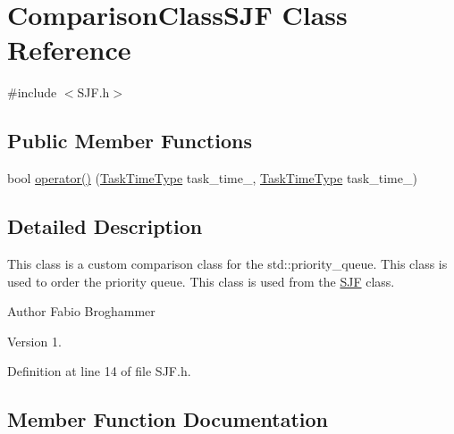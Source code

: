 \hypertarget{class_comparison_class_s_j_f}{}\section{Comparison\+Class\+S\+J\+F Class Reference}
\label{class_comparison_class_s_j_f}


{\ttfamily \#include $<$S\+J\+F.\+h$>$}

\subsection*{Public Member Functions}
\begin{DoxyCompactItemize}
\item 
bool \hyperlink{class_comparison_class_s_j_f_a7cbc92a9f2f87912040ce92e79d0aa2b}{operator()} (\hyperlink{_scheduling_strategy_8h_a3fb457f0594d33676e56256c3403e52b}{Task\+Time\+Type} task\+\_\+time\+\_, \hyperlink{_scheduling_strategy_8h_a3fb457f0594d33676e56256c3403e52b}{Task\+Time\+Type} task\+\_\+time\+\_)
\end{DoxyCompactItemize}


\subsection{Detailed Description}
This class is a custom comparison class for the std\+::priority\+\_\+queue. This class is used to order the priority queue. This class is used from the \hyperlink{class_s_j_f}{S\+J\+F} class.

\begin{DoxyAuthor}{Author}
Fabio Broghammer 
\end{DoxyAuthor}
\begin{DoxyVersion}{Version}
1. 
\end{DoxyVersion}


Definition at line 14 of file S\+J\+F.\+h.



\subsection{Member Function Documentation}
\hypertarget{class_comparison_class_s_j_f_a7cbc92a9f2f87912040ce92e79d0aa2b}{}
